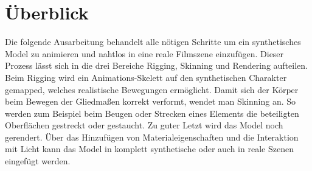 \section{Überblick}
Die folgende Ausarbeitung behandelt alle nötigen Schritte um ein synthetisches Model zu animieren und nahtlos in eine reale Filmszene einzufügen. Dieser Prozess lässt sich in die drei Bereiche Rigging, Skinning und Rendering aufteilen. Beim Rigging wird ein Animations-Skelett auf den synthetischen Charakter gemapped, welches realistische Bewegungen ermöglicht. Damit sich der Körper beim Bewegen der Gliedmaßen korrekt verformt, wendet man Skinning an. So werden zum Beispiel beim Beugen oder Strecken eines Elements die beteiligten Oberflächen gestreckt oder gestaucht. Zu guter Letzt wird das Model noch gerendert. Über das Hinzufügen von Materialeigenschaften und die Interaktion mit Licht kann das Model in komplett synthetische oder auch in reale Szenen eingefügt werden.